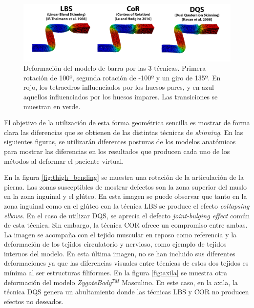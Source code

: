 \begin{figure}[ht]%
  \centering
  \includegraphics[width=\textwidth]{IMG/BarraCoR}
    \caption{Deformación del modelo de barra por las 3 técnicas. Primera rotación de 100º, segunda rotación de -100º y un giro de 135º. En rojo, los tetraedros influenciados por los huesos pares, y en azul aquellos influenciados por los huesos impares. Las transiciones se muestran en verde.}
    \label{fig:bar_bending}
\end{figure}

El objetivo de la utilización de esta forma geométrica sencilla es mostrar de forma clara las diferencias que se obtienen de las distintas técnicas de \emph{skinning}. %
En las siguientes figuras, se utilizarán diferentes posturas de los modelos anatómicos para mostrar las diferencias en los resultados que producen cada uno de los métodos al deformar el paciente virtual.

En la figura \ref{fig:thigh_bending} se muestra una rotación de la articulación de la pierna. Las zonas susceptibles de mostrar defectos son la zona superior del muslo en la zona inguinal y el glúteo. En esta imagen se puede observar que tanto en la zona inguinal como en el glúteo con la técnica \ac{LBS} se produce el efecto \emph{collapsing elbows}. En el caso de utilizar \ac{DQS}, se aprecia el defecto \emph{joint-bulging effect} común de esta técnica. Sin embargo, la técnica \ac{COR} ofrece un compromiso entre ambas. La imagen se acompaña con el tejido muscular en reposo como referencia y la deformación de los tejidos circulatorio y nervioso, como ejemplo de tejidos internos del modelo. En esta última imagen, no se han incluido sus diferentes deformaciones ya que las diferencias visuales entre técnicas de estos dos tejidos es mínima al ser estructuras filiformes. En la figura \ref{fig:axila} se muestra otra deformación del modelo \emph{ZygoteBody}$^{TM}$ Masculino. En este caso, en la axila, la técnica \ac{DQS} genera un abultamiento donde las técnicas \ac{LBS} y \ac{COR} no producen efectos no deseados.



